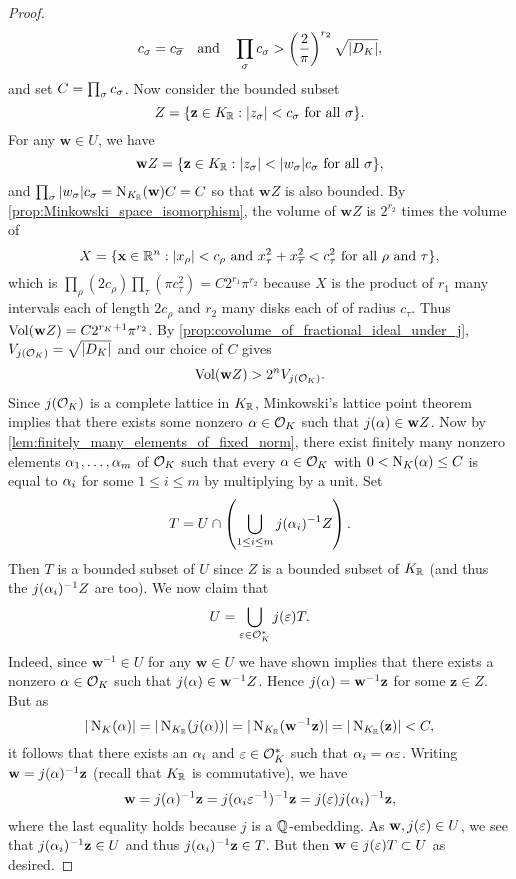 \begin{proof}
      \[
        c_{\sigma} = c_{\overline{\sigma}} \quad \text{and} \quad \prod_{\sigma}c_{\sigma} > \left(\frac{2}{\pi}\right)^{r_{2}}\sqrt{|D_{K}|},
      \]
      and set $C = \prod_{\sigma}c_{\sigma}$. Now consider the bounded subset
      \[
        Z = \{\mathbf{z} \in K_{\mathbb{R}}:\text{$|z_{\sigma}| < c_{\sigma}$ for all $\sigma$}\}.
      \]
      For any $\mathbf{w} \in U$, we have
      \[
        \mathbf{w}Z = \{\mathbf{z} \in K_{\mathbb{R}}:\text{$|z_{\sigma}| < |w_{\sigma}|c_{\sigma}$ for all $\sigma$}\},
      \]
      and $\prod_{\sigma}|w_{\sigma}|c_{\sigma} = \operatorname{\mathrm{N}}_{K_{\mathbb{R}}}(\mathbf{w})C = C$ so that $\mathbf{w}Z$ is also bounded. By \cref{prop:Minkowski_space_isomorphism}, the volume of $\mathbf{w}Z$ is $2^{r_{2}}$ times the volume of
      \[
        X = \{\mathbf{x} \in \mathbb{R}^{n}:\text{$|x_{\rho}| < c_{\rho}$ and $x_{\tau}^{2}+x_{\overline{\tau}}^{2} < c_{\tau}^{2}$ for all $\rho$ and $\tau$}\},
      \]
      which is $\prod_{\rho}(2c_{\rho})\prod_{\tau}(\pi c_{\tau}^{2}) = C2^{r_{1}}\pi^{r_{2}}$ because $X$ is the product of $r_{1}$ many intervals each of length $2c_{\rho}$ and $r_{2}$ many disks each of of radius $c_{\tau}$. Thus $\operatorname{\mathrm{Vol}}(\mathbf{w}Z) = C2^{r_{K}+1}\pi^{r_{2}}$. By \cref{prop:covolume_of_fractional_ideal_under_j}, $V_{j(\mathcal{O}_{K})} = \sqrt{|D_{K}|}$ and our choice of $C$ gives
      \[
        \operatorname{\mathrm{Vol}}(\mathbf{w}Z) > 2^{n}V_{j(\mathcal{O}_{K})}.
      \]
      Since $j(\mathcal{O}_{K})$ is a complete lattice in $K_{\mathbb{R}}$, Minkowski's lattice point theorem implies that there exists some nonzero $\alpha \in \mathcal{O}_{K}$ such that $j(\alpha) \in \mathbf{w}Z$. Now by \cref{lem:finitely_many_elements_of_fixed_norm}, there exist finitely many nonzero elements $\alpha_{1},\ldots,\alpha_{m}$ of $\mathcal{O}_{K}$ such that every $\alpha \in \mathcal{O}_{K}$ with $0 < \operatorname{\mathrm{N}}_{K}(\alpha) \le C$ is equal to $\alpha_{i}$ for some $1 \le i \le m$ by multiplying by a unit. Set
      \[
        T = U \cap \left(\bigcup_{1 \le i \le m}j(\alpha_{i})^{-1}Z\right).
      \]
      Then $T$ is a bounded subset of $U$ since $Z$ is a bounded subset of $K_{\mathbb{R}}$ (and thus the $j(\alpha_{i})^{-1}Z$ are too). We now claim that
      \[
        U = \bigcup_{\varepsilon \in \mathcal{O}_{K}^{\ast}}j(\varepsilon)T.
      \]
      Indeed, since $\mathbf{w}^{-1} \in U$ for any $\mathbf{w} \in U$  we have shown implies that there exists a nonzero $\alpha \in \mathcal{O}_{K}$ such that $j(\alpha) \in \mathbf{w}^{-1}Z$. Hence $j(\alpha) = \mathbf{w}^{-1}\mathbf{z}$ for some $\mathbf{z} \in Z$. But as
      \[
        |\operatorname{\mathrm{N}}_{K}(\alpha)| = |\operatorname{\mathrm{N}}_{K_{\mathbb{R}}}(j(\alpha))| = |\operatorname{\mathrm{N}}_{K_{\mathbb{R}}}(\mathbf{w}^{-1}\mathbf{z})| = |\operatorname{\mathrm{N}}_{K_{\mathbb{R}}}(\mathbf{z})| < C,
      \]
      it follows that there exists an $\alpha_{i}$ and $\varepsilon \in \mathcal{O}_{K}^{\ast}$ such that $\alpha_{i} = \alpha\varepsilon$. Writing $\mathbf{w} = j(\alpha)^{-1}\mathbf{z}$ (recall that $K_{\mathbb{R}}$ is commutative), we have 
      \[
        \mathbf{w} = j(\alpha)^{-1}\mathbf{z} = j(\alpha_{i}\varepsilon^{-1})^{-1}\mathbf{z} = j(\varepsilon)j(\alpha_{i})^{-1}\mathbf{z},
      \]
      where the last equality holds because $j$ is a $\mathbb{Q}$-embedding. As $\mathbf{w},j(\varepsilon) \in U$, we see that $j(\alpha_{i})^{-1}\mathbf{z} \in U$ and thus $j(\alpha_{i})^{-1}\mathbf{z} \in T$. But then $\mathbf{w} \in j(\varepsilon)T \subset U$ as desired.
    \end{proof}

